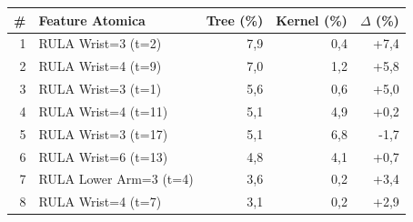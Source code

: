 \begin{tabular*}{\linewidth}{@{}r@{\extracolsep{\fill}}lrrr@{}}
\toprule
\textbf{\#} & \textbf{Feature Atomica} & \textbf{Tree (\%)} & \textbf{Kernel (\%)} & \textbf{$\Delta$ (\%)} \\
\midrule
1 & RULA Wrist=3 (t=2) & 7{,}9 & 0{,}4 & +7{,}4 \\
2 & RULA Wrist=4 (t=9) & 7{,}0 & 1{,}2 & +5{,}8 \\
3 & RULA Wrist=3 (t=1) & 5{,}6 & 0{,}6 & +5{,}0 \\
4 & RULA Wrist=4 (t=11) & 5{,}1 & 4{,}9 & +0{,}2 \\
5 & RULA Wrist=3 (t=17) & 5{,}1 & 6{,}8 & -1{,}7 \\
6 & RULA Wrist=6 (t=13) & 4{,}8 & 4{,}1 & +0{,}7 \\
7 & RULA Lower Arm=3 (t=4) & 3{,}6 & 0{,}2 & +3{,}4 \\
8 & RULA Wrist=4 (t=7) & 3{,}1 & 0{,}2 & +2{,}9 \\
\bottomrule
\end{tabular*}
